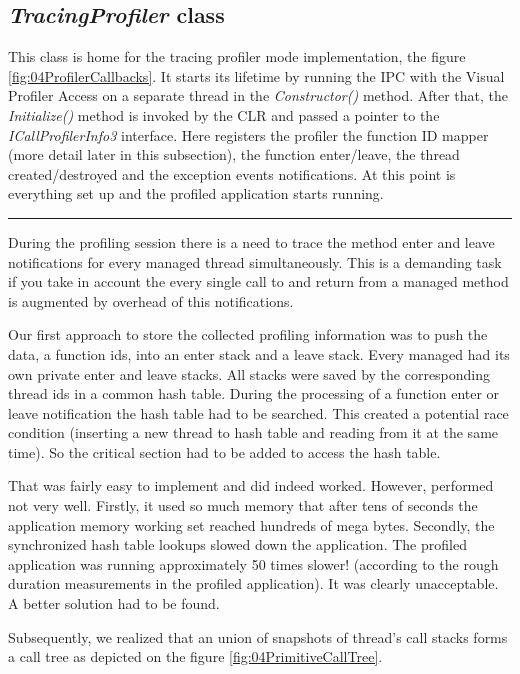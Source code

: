 \subsection{\textit{TracingProfiler} class}
This class is home for the tracing profiler mode implementation, the figure \ref{fig:04ProfilerCallbacks}. It starts its lifetime by running the IPC with the Visual Profiler Access on a separate thread in the \textit{Constructor()} method. After that, the \textit{Initialize()} method is invoked by the CLR and passed a pointer to the \textit{ICallProfilerInfo3} interface. Here registers the profiler the function ID mapper (more detail later in this subsection), the function enter/leave, the thread created/destroyed and the exception events notifications. At this point is everything set up and the profiled application starts running.

\begin{center}
\rule{300pt}{1.5pt}
\end{center}
During the profiling session there is a need to trace the method enter and leave notifications for every managed thread simultaneously. This is a demanding task if you take in account the every single call to and return from a managed method is augmented by overhead of this notifications. 

Our first approach to store the collected profiling information was to push the data, a function ids, into an enter stack and a leave stack. Every managed had its own private enter and leave stacks. All stacks were saved by the corresponding thread ids in a common hash table. During the processing of a function enter or leave notification the hash table had to be searched. This created a potential race condition (inserting a new thread to hash table and reading from it at the same time). So the critical section had to be added to access the hash table.

That was fairly easy to implement and did indeed worked. However, performed not very well. Firstly, it used so much memory that after tens of seconds the application memory working set reached hundreds of mega bytes. Secondly, the synchronized hash table lookups slowed down the application. The profiled application was running approximately 50 times slower! (according to the rough duration measurements in the profiled application). It was clearly unacceptable. A better solution had to be found. 

Subsequently, we realized that an union of snapshots of thread's call stacks forms a call tree as depicted on the figure \ref{fig:04PrimitiveCallTree}.


